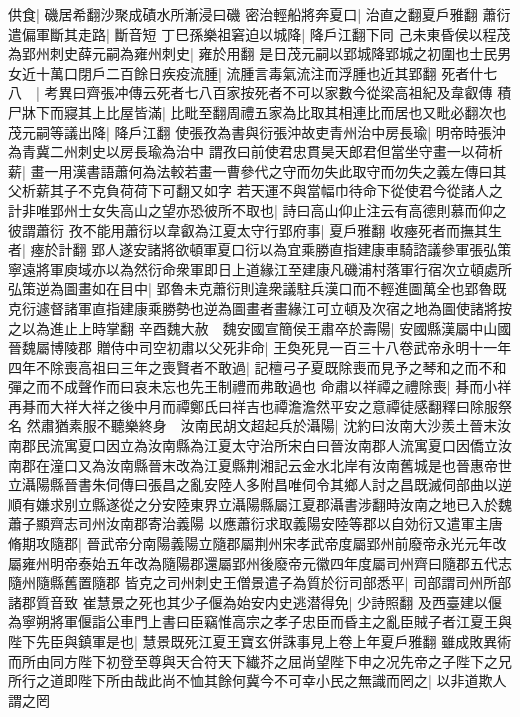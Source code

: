 供食|{
	磯居希翻沙聚成磧水所漸浸曰磯}
密治輕船將奔夏口|{
	治直之翻夏戶雅翻}
蕭衍遣偏軍斷其走路|{
	斷音短}
丁巳孫樂祖窘迫以城降|{
	降戶江翻下同}
己未東昏侯以程茂為郢州刺史薛元嗣為雍州刺史|{
	雍於用翻}
是日茂元嗣以郢城降郢城之初圍也士民男女近十萬口閉戶二百餘日疾疫流腫|{
	流腫言毒氣流注而浮腫也近其郢翻}
死者什七八　|{
	考異曰齊張冲傳云死者七八百家按死者不可以家數今從梁高祖紀及韋叡傳}
積尸牀下而寢其上比屋皆滿|{
	比毗至翻周禮五家為比取其相連比而居也又毗必翻次也}
茂元嗣等議出降|{
	降戶江翻}
使張孜為書與衍張沖故吏青州治中房長瑜|{
	明帝時張沖為青冀二州刺史以房長瑜為治中}
謂孜曰前使君忠貫昊天郎君但當坐守畫一以荷析薪|{
	畫一用漢書語蕭何為法較若畫一曹參代之守而勿失此取守而勿失之義左傳曰其父析薪其子不克負荷荷下可翻又如字}
若天運不與當幅巾待命下從使君今從諸人之計非唯郢州士女失高山之望亦恐彼所不取也|{
	詩曰高山仰止注云有高德則慕而仰之彼謂蕭衍}
孜不能用蕭衍以韋叡為江夏太守行郢府事|{
	夏戶雅翻}
收瘞死者而撫其生者|{
	瘞於計翻}
郢人遂安諸將欲頓軍夏口衍以為宜乘勝直指建康車騎諮議參軍張弘策寧遠將軍庾域亦以為然衍命衆軍即日上道緣江至建康凡磯浦村落軍行宿次立頓處所弘策逆為圖畫如在目中|{
	郢魯未克蕭衍則違衆議駐兵漢口而不輕進圖萬全也郢魯既克衍遽督諸軍直指建康乘勝勢也逆為圖畫者畫緣江可立頓及次宿之地為圖使諸將按之以為進止上時掌翻}
辛酉魏大赦　魏安國宣簡侯王肅卒於壽陽|{
	安國縣漢屬中山國晉魏屬博陵郡}
贈侍中司空初肅以父死非命|{
	王奐死見一百三十八卷武帝永明十一年}
四年不除喪高祖曰三年之喪賢者不敢過|{
	記檀弓子夏既除喪而見予之琴和之而不和彈之而不成聲作而曰哀未忘也先王制禮而弗敢過也}
命肅以祥禫之禮除喪|{
	朞而小祥再朞而大祥大祥之後中月而禫鄭氏曰祥吉也禫澹澹然平安之意禫徒感翻釋曰除服祭名}
然肅猶素服不聽樂終身　汝南民胡文超起兵於灄陽|{
	沈約曰汝南大沙羨土晉末汝南郡民流寓夏口因立為汝南縣為江夏太守治所宋白曰晉汝南郡人流寓夏口因僑立汝南郡在潼口又為汝南縣晉末改為江夏縣荆湘記云金水北岸有汝南舊城是也晉惠帝世立灄陽縣晉書朱伺傳曰張昌之亂安陸人多附昌唯伺令其鄉人討之昌既滅伺部曲以逆順有嫌求别立縣遂從之分安陸東界立灄陽縣屬江夏郡灄書涉翻時汝南之地已入於魏蕭子顯齊志司州汝南郡寄治義陽}
以應蕭衍求取義陽安陸等郡以自効衍又遣軍主唐脩期攻隨郡|{
	晉武帝分南陽義陽立隨郡屬荆州宋孝武帝度屬郢州前廢帝永光元年改屬雍州明帝泰始五年改為隨陽郡還屬郢州後廢帝元徽四年度屬司州齊曰隨郡五代志隨州隨縣舊置隨郡}
皆克之司州刺史王僧景遣子為質於衍司部悉平|{
	司部謂司州所部諸郡質音致}
崔慧景之死也其少子偃為始安内史逃潜得免|{
	少詩照翻}
及西臺建以偃為寧朔將軍偃詣公車門上書曰臣竊惟高宗之孝子忠臣而昏主之亂臣賊子者江夏王與陛下先臣與鎮軍是也|{
	慧景既死江夏王寶玄併誅事見上卷上年夏戶雅翻}
雖成敗異術而所由同方陛下初登至尊與天合符天下纎芥之屈尚望陛下申之况先帝之子陛下之兄所行之道即陛下所由哉此尚不恤其餘何冀今不可幸小民之無識而罔之|{
	以非道欺人謂之罔}
